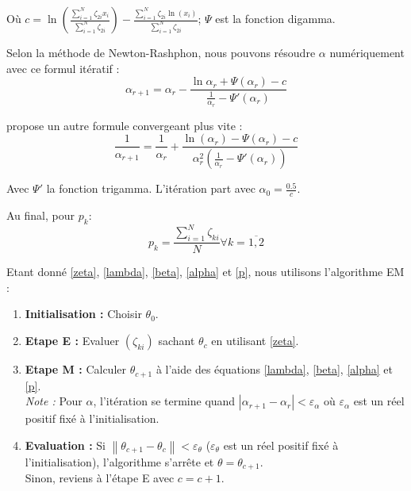 \documentclass[10pt,a4paper]{article}
\begin{document}
Où $c = \ln \left( {\frac{{\sum\limits_{i = 1}^N {{\zeta _{2i}}{x_i}} }}{{\sum\limits_{i = 1}^N {{\zeta _{2i}}} }}} \right) - \frac{{\sum\limits_{i = 1}^N {{\zeta _{2i}}\ln \left( {{x_i}} \right)} }}{{\sum\limits_{i = 1}^N {{\zeta _{2i}}} }}$; $\Psi$ est la fonction digamma.

Selon la méthode de Newton-Rashphon, nous pouvons résoudre $\alpha$ numériquement avec ce formul itératif :
\[{\alpha _{r + 1}} = {\alpha _r} - \frac{{\ln {\alpha _r} + \Psi \left( {{\alpha _r}} \right) - c}}{{\frac{1}{{{\alpha _r}}} - \Psi '\left( {{\alpha _r}} \right)}}\]

\cite{bib:gamma} propose un autre formule convergeant plus vite :
\begin{equation}
    \label{alpha}
    \frac{1}{{{\alpha _{r + 1}}}} = \frac{1}{{{\alpha _r}}} + \frac{{\ln \left( {{\alpha _r}} \right) - \Psi \left( {{\alpha _r}} \right) - c}}{{\alpha_r^2\left( {\frac{1}{{{\alpha _r}}} - \Psi '\left( {{\alpha _r}} \right)} \right)}}
\end{equation}

Avec $\Psi'$ la fonction trigamma. L'itération part avec ${\alpha _0} = \frac{{0.5}}{c}$.

Au final, pour $p_k$:
\begin{equation}
    \label{p}
    {p_k} = \frac{{\sum\limits_{i = 1}^N {{\zeta _{ki}}} }}{N}\forall k = \overline {1,2}
\end{equation}

Etant donné \eqref{zeta}, \eqref{lambda}, \eqref{beta}, \eqref{alpha} et \eqref{p}, nous utilisons l'algorithme EM :
\begin{enumerate}
    \item \textbf{Initialisation :} Choisir $\theta_{0}$.
    \item \textbf{Etape E :} Evaluer $(\zeta_{ki})$ sachant $\theta_{c}$ en utilisant \eqref{zeta}.
    \item \textbf{Etape M :} Calculer $\theta_{c+1}$ à l'aide des équations \eqref{lambda}, \eqref{beta}, \eqref{alpha} et \eqref{p}. \\
    \emph{Note :} Pour $\alpha$, l'itération se termine quand $\left| {{\alpha _{r + 1}} - {\alpha _r}} \right| < {\varepsilon_\alpha }$ où $\varepsilon_\alpha$ est un réel positif fixé à l'initialisation.
    \item \textbf{Evaluation :} Si $\left\| {{\theta_{c + 1}} - {\theta_c}} \right\| < {\varepsilon _\theta }$ ($\varepsilon_\theta$ est un réel positif fixé à l'initialisation), l'algorithme s'arrête et $\theta = \theta_{c+1}$. \\ Sinon, reviens à l'étape E avec $c=c+1$.
\end{enumerate}
\end{document}
